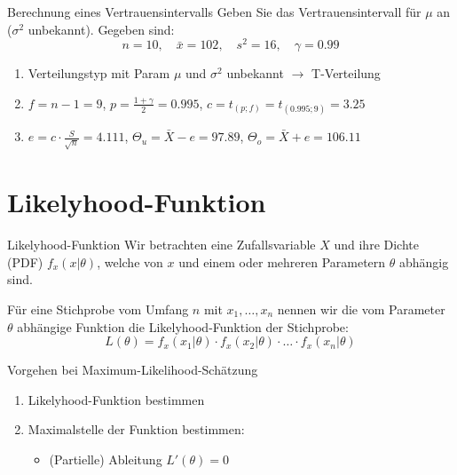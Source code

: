 \begin{example}{Berechnung eines Vertrauensintervalls}
Geben Sie das Vertrauensintervall für $\mu$ an ($\sigma^2$ unbekannt). Gegeben sind:
$$
n=10, \quad \bar{x}=102, \quad s^2=16, \quad \gamma=0.99
$$

\begin{enumerate}
  \item Verteilungstyp mit Param $\mu$ und $\sigma^2$ unbekannt $\rightarrow$ T-Verteilung
  \item $f=n-1=9$, $p=\frac{1+\gamma}{2}=0.995$, $c=t_{(p;f)}=t_{(0.995;9)}=3.25$
  \item $e=c \cdot \frac{S}{\sqrt{n}}=4.111$, $\Theta_u=\bar{X}-e=97.89$, $\Theta_o=\bar{X}+e=106.11$
\end{enumerate}
\end{example}

\section{Likelyhood-Funktion}
\begin{definition}{Likelyhood-Funktion}
Wir betrachten eine Zufallsvariable $X$ und ihre Dichte (PDF) $f_x(x|\theta)$, welche von $x$ und einem oder mehreren Parametern $\theta$ abhängig sind. 

Für eine Stichprobe vom Umfang $n$ mit $x_1,\ldots,x_n$ nennen wir die vom Parameter $\theta$ abhängige Funktion die Likelyhood-Funktion der Stichprobe:
$$
L(\theta)=f_x(x_1|\theta) \cdot f_x(x_2|\theta) \cdot \ldots \cdot f_x(x_n|\theta)
$$
\end{definition}

\begin{concept}{Vorgehen bei Maximum-Likelihood-Schätzung}
\begin{enumerate}
  \item Likelyhood-Funktion bestimmen
  \item Maximalstelle der Funktion bestimmen:
        \begin{itemize}
           \item (Partielle) Ableitung $L'(\theta)=0$
        \end{itemize}
\end{enumerate}
\end{concept}
